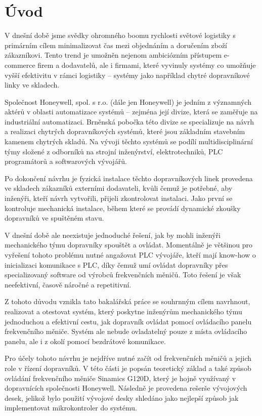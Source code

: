 \chapter*{Úvod}\label{chap:uvod}

V dnešní době jsme svědky ohromného boomu rychlosti světové logistiky s primárním cílem minimalizovat čas mezi objednáním a doručením zboží zákazníkovi. Tento trend je umožněn nejenom ambiciózním přístupem e-commerce firem a dodavatelů, ale i firmami, které vyvinuly systémy co umožňuje vyšší efektivitu v rámci logistiky – systémy jako například chytré dopravníkové linky ve skladech.

Společnost Honeywell, spol. s r.o. (dále jen Honeywell) je jedním z významných aktérů v oblasti automatizace systémů – zejména její divize, která se zaměřuje na industriální automatizaci. Brněnská pobočka této divize se specializuje na návrh a realizaci chytrých dopravníkových systémů, které jsou základním stavebním kamenem chytrých skladů. Na vývoji těchto systémů se podílí multidisciplinární týmy složené z odborníků na strojní inženýrství, elektrotechniků, PLC programátorů a softwarových vývojářů.

Po dokončení návrhu je fyzická instalace těchto dopravníkových linek provedena ve skladech zákazníků externími dodavateli, kvůli čemuž je potřebné, aby inženýři, kteří návrh vytvořili, přijeli zkontrolovat instalaci. Jako první se kontroluje mechanická instalace, během které se provádí dynamické zkoušky dopravníků ve spuštěném stavu.

V dnešní době ale neexistuje jednoduché řešení, jak by mohli inženýři mechanického týmu dopravníky spouštět a ovládat. Momentálně je většinou pro vyřešení tohoto problému nutné angažovat PLC vývojáře, kteří mají know-how o inicializaci komunikace s PLC, díky čemuž umí ovládat dopravníky přes specializovaný software od výrobců frekvenčních měničů. Toto řešení je však neefektivní, časově náročné a repetitivní.

Z tohoto důvodu vznikla tato bakalářská práce se souhrnným cílem navrhnout, realizovat a otestovat systém, který poskytne inženýrům mechanického týmu jednoduchou a efektivní cestu, jak dopravník ovládat pomocí ovládacího panelu frekvenčního měniče. Systém ale nebude ovladatelný pouze z místa ovládacího panelu, ale i z okolí pomocí bezdrátové komunikace.

Pro účely tohoto návrhu je nejdříve nutné začít od frekvenčních měničů a jejich role v řízení dopravníků. V této části je popsán teoretický základ a také způsob ovládání frekvenčního měniče Sinamics G120D, který je hojně využívaný v dopravnících společnosti Honeywell. Následně je provedena rešerše vývojových desek, jelikož bylo použití vývojové desky shledáno jako nejlepší způsob jak implementovat mikrokontroler do systému.

